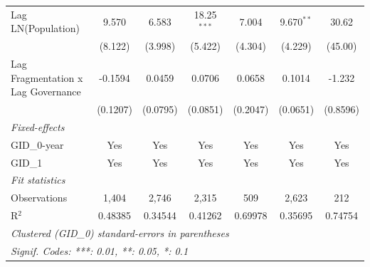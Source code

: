 \begin{table}[htbp]
\begin{tabular}{lcccccc}
      Lag LN(Population)                 & 9.570    & 6.583          & 18.25$^{***}$ & 7.004        & 9.670$^{**}$   & 30.62\\   
                                         & (8.122)  & (3.998)        & (5.422)       & (4.304)      & (4.229)        & (45.00)\\   
      Lag Fragmentation x Lag Governance & -0.1594  & 0.0459         & 0.0706        & 0.0658       & 0.1014         & -1.232\\   
                                         & (0.1207) & (0.0795)       & (0.0851)      & (0.2047)     & (0.0651)       & (0.8596)\\   
      \midrule
      \emph{Fixed-effects}\\
      GID\_0-year                        & Yes      & Yes            & Yes           & Yes          & Yes            & Yes\\  
      GID\_1                             & Yes      & Yes            & Yes           & Yes          & Yes            & Yes\\  
      \midrule
      \emph{Fit statistics}\\
      Observations                       & 1,404    & 2,746          & 2,315         & 509          & 2,623          & 212\\  
      R$^2$                              & 0.48385  & 0.34544        & 0.41262       & 0.69978      & 0.35695        & 0.74754\\  
      \midrule \midrule
      \multicolumn{7}{l}{\emph{Clustered (GID\_0) standard-errors in parentheses}}\\
      \multicolumn{7}{l}{\emph{Signif. Codes: ***: 0.01, **: 0.05, *: 0.1}}\\
   \end{tabular}
\end{table}



